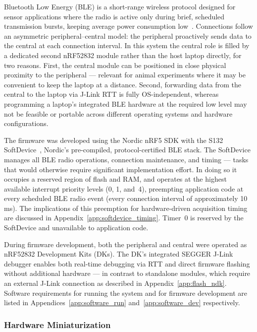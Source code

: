Bluetooth Low Energy (BLE) is a short-range wireless protocol designed for
sensor applications where the radio is active only during brief, scheduled
transmission bursts, keeping average power consumption low~\cite{tosi2017performance}.
Connections follow an asymmetric peripheral--central model: the peripheral
proactively sends data to the central at each connection interval.
In this system the central role is filled by a dedicated second nRF52832 module
rather than the host laptop directly, for two reasons. First, the central module
can be positioned in close physical proximity to the peripheral --- relevant for
animal experiments where it may be convenient to keep the laptop at a distance. Second, forwarding
data from the central to the laptop via J-Link RTT is fully OS-independent, whereas
programming a laptop's integrated BLE hardware at the required low level may not be
feasible or portable across different operating systems and hardware configurations.

The firmware was developed using the Nordic nRF5 SDK with the S132
SoftDevice~\cite{nordic_s132_sds_v72}, Nordic's pre-compiled, protocol-certified
BLE stack. The SoftDevice manages all BLE radio operations, connection
maintenance, and timing --- tasks that would otherwise require significant
implementation effort. In doing so it occupies a reserved
region of flash and RAM, and operates at the highest available interrupt priority
levels (0, 1, and~4), preempting application code at every scheduled BLE radio
event (every connection interval of approximately 10\,ms). The implications of
this preemption for hardware-driven acquisition timing are discussed in
Appendix~\ref{app:softdevice_timing}. Timer~0 is reserved by the SoftDevice and unavailable to application code.

During firmware development, both the peripheral and central were operated as
nRF52832 Development Kits (DKs). The DK's integrated SEGGER J-Link debugger
enables both real-time debugging via RTT and direct firmware flashing without
additional hardware --- in contrast to standalone modules, which require an
external J-Link connection as described in Appendix~\ref{app:flash_ndk}. Software requirements for running the system and
for firmware development are listed in Appendices~\ref{app:software_run}
and~\ref{app:software_dev} respectively.

\subsubsection{Hardware Miniaturization}
\label{sec:miniaturization}

